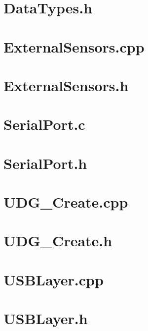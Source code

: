 \documentclass[letterpaper,openright,12pt]{book}
\begin{document}
\section{DataTypes.h}


\section{ExternalSensors.cpp}


\section{ExternalSensors.h}


\section{SerialPort.c}


\section{SerialPort.h}


\section{UDG\_Create.cpp}


\section{UDG\_Create.h}


\section{USBLayer.cpp}


\section{USBLayer.h}

\end{document}
